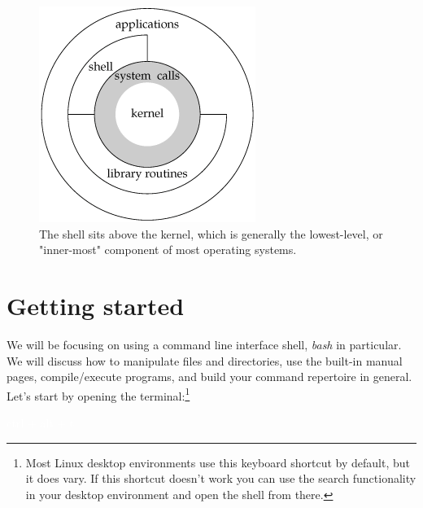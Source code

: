 \documentclass[oneside]{book}
\newcommand{\commandline}[1]{\begin{center} \colorbox{Dark}{\textcolor{white}{#1}} \end{center}}
\begin{document}
\begin{figure}[H]
	\centering
	\includegraphics[scale=0.5]{kernel.png}
	\caption{The shell sits above the kernel, which is generally the lowest-level, or "inner-most" component of most operating systems.} 
\end{figure}

\section{Getting started}
We will be focusing on using a command line interface shell, \textit{bash} in particular. We will discuss how to manipulate files and directories, use the built-in manual pages, compile/execute programs, and build your command repertoire in general. Let's start by opening the terminal:\footnote{Most Linux desktop environments use this keyboard shortcut by default, but it does vary. If this shortcut doesn't work you can use the search functionality in your desktop environment and open the shell from there.}

\commandline{ctrl + alt + t}


\end{document}
